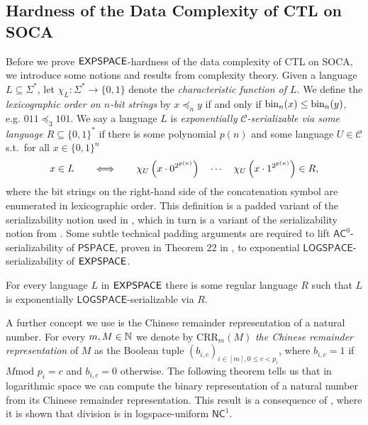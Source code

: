 \documentclass[times,envcountsame]{llncs}
\renewcommand{\mod}{\text{mod }}
\newcommand{\modulo}{\mod}
\def\AC{{\mathsf{AC}}}
\def\CRR{{\mathrm{CRR}}}
\def\PSPACE{{\mathsf{PSPACE}}}
\renewcommand{\L}{\mathsf{LOGSPACE}}
\begin{document}
\subsection{Hardness of the Data Complexity of CTL on SOCA}{\label{S CTL hardness}}
Before we prove ${\mathsf{EXPSPACE}}$-hardness of the data complexity of CTL on SOCA, we
introduce some notions and results from complexity theory.
Given a language $L\subseteq\Sigma^*$, let $\chi_L:\Sigma^*\rightarrow\{0,1\}$
denote the {\em characteristic function of $L$}.
We define the {\em lexicographic
order on $n$-bit strings}
by $x\preceq_n y$ if and only if
$\text{bin}_n(x)\leq\text{bin}_n(y)$, e.g. $011 \preceq_3 101$.
\renewcommand{\C}{\mathcal{C}}
We say a language $L$ is {\em exponentially $\C$-serializable via some language
$R\subseteq\{0,1\}^*$} if there is some polynomial $p(n)$ and some language
$U\in\C$ s.t.\ for all $x\in\{0,1\}^n$\\[-0.2cm]
$$x\in L\qquad\!\!\iff\qquad\!\!
\chi_U\left(x \cdot 0^{2^{p(n)}}\right)\quad \cdots\quad \chi_U\left(x
\cdot 1^{2^{p(n)}}\right)\in
R,\\[-0.1cm]
$$ where the bit strings on the right-hand side of the
concatenation symbol are enumerated in
lexicographic order.
This definition is a padded variant of the serializability notion used
in \cite{GoLo09}, which in turn is a variant of the serializability notion
from \cite{CaFu91,HLSVW93,Vol98}.
Some subtle technical padding arguments are required
to lift $\AC^0$-serializability of $\PSPACE$, proven in
Theorem 22 in \cite{GoLo09}, to exponential
$\L$-serializability of ${\mathsf{EXPSPACE}}$.%

\begin{theorem}\label{T succ seri}
For every language $L$ in ${\mathsf{EXPSPACE}}$ there is some regular language $R$ such
that $L$ is exponentially $\L$-serializable via $R$.
\end{theorem}
\renewcommand{\M}{\mathcal{M}}
A further concept we use is the Chinese remainder
representation of a natural number. For every $m,M\in\mathbb{N}$ we denote by $\CRR_m(M)$ {\em the Chinese remainder
representation} of $M$ as the Boolean tuple
$(b_{i,c})_{i\in[m],0\leq c<p_i}$, where $b_{i,c}=1$ if $M\modulo p_i=c$
and $b_{i,c}=0$ otherwise.
The following theorem tells us that in logarithmic space we can
compute the binary representation of a natural number from its Chinese
remainder representation.
This result is a consequence of \cite{ChDaLi01}, where it is shown that division is in logspace-uniform
$\mathsf{NC}^1$.
\end{document}
